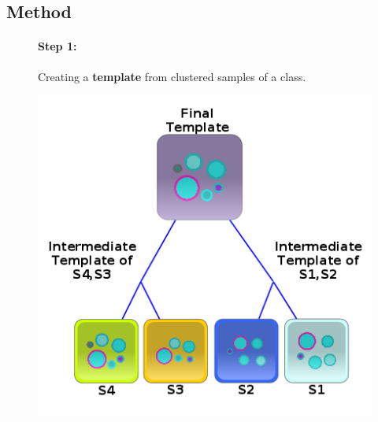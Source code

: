 \documentclass[landscape]{sciposter}
\begin{document}
\begin{multicols}{5}
\columnbreak
\section*{Method}

\begin{figure}[t!h]
\begin{minipage}[b]{\linewidth}
\paragraph*{Step 1:}
Creating a \textbf{template} from clustered samples of a class.
\end{minipage} \hfill
\begin{minipage} [b]{\linewidth}
\centering
\includegraphics[width=0.75\linewidth]{images/Network-big.png}
\end{minipage}

\end{figure}
\end{multicols}
\end{document}
